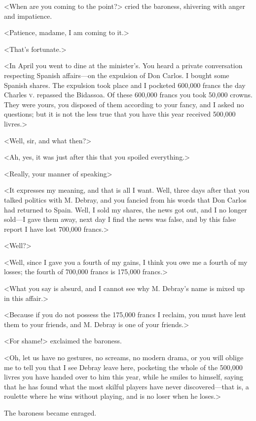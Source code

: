  <When are you coming to the point?> cried the baroness, shivering with anger and impatience. 

 <Patience, madame, I am coming to it.> 

 <That's fortunate.> 

 <In April you went to dine at the minister's. You heard a private conversation respecting Spanish affairs—on the expulsion of Don Carlos. I bought some Spanish shares. The expulsion took place and I pocketed 600,000 francs the day Charles \textsc{v.} repassed the Bidassoa. Of these 600,000 francs you took 50,000 crowns. They were yours, you disposed of them according to your fancy, and I asked no questions; but it is not the less true that you have this year received 500,000 livres.> 

 <Well, sir, and what then?> 

 <Ah, yes, it was just after this that you spoiled everything.> 

 <Really, your manner of speaking\longdash> 

 <It expresses my meaning, and that is all I want. Well, three days after that you talked politics with M. Debray, and you fancied from his words that Don Carlos had returned to Spain. Well, I sold my shares, the news got out, and I no longer sold—I gave them away, next day I find the news was false, and by this false report I have lost 700,000 francs.> 

 <Well?> 

 <Well, since I gave you a fourth of my gains, I think you owe me a fourth of my losses; the fourth of 700,000 francs is 175,000 francs.> 

 <What you say is absurd, and I cannot see why M. Debray's name is mixed up in this affair.> 

 <Because if you do not possess the 175,000 francs I reclaim, you must have lent them to your friends, and M. Debray is one of your friends.>

<For shame!> exclaimed the baroness. 

 <Oh, let us have no gestures, no screams, no modern drama, or you will oblige me to tell you that I see Debray leave here, pocketing the whole of the 500,000 livres you have handed over to him this year, while he smiles to himself, saying that he has found what the most skilful players have never discovered—that is, a roulette where he wins without playing, and is no loser when he loses.> 

 The baroness became enraged. 

